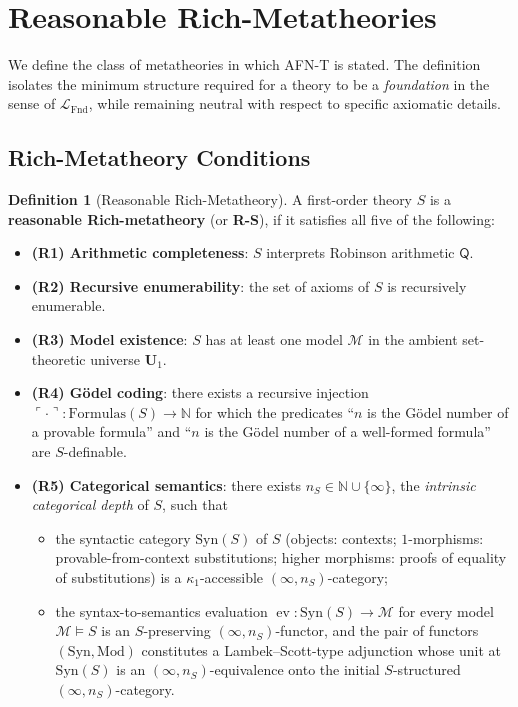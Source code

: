 \documentclass[11pt]{article}
\theoremstyle{plain}
\theoremstyle{definition}
\newtheorem{definition}[theorem]{Definition}
\newcommand{\cM}{\mathcal{M}}
\newcommand{\LFnd}{\mathcal{L}_{\mathrm{Fnd}}}
\newcommand{\Syn}{\mathrm{Syn}}
\newcommand{\Mod}{\mathrm{Mod}}
\DeclareMathOperator{\ev}{ev}
\begin{document}
\section{Reasonable Rich-Metatheories}\label{sec:rs}

We define the class of metatheories in which AFN-T is stated. The definition isolates the minimum structure required for a theory to be a \emph{foundation} in the sense of $\LFnd$, while remaining neutral with respect to specific axiomatic details.

\subsection{Rich-Metatheory Conditions}

\begin{definition}[Reasonable Rich-Metatheory]\label{def:rs}
A first-order theory $S$ is a \textbf{reasonable Rich-metatheory} (or \textbf{R-S}), if it satisfies all five of the following:
\begin{itemize}
\item \textbf{(R1) Arithmetic completeness}: $S$ interprets Robinson arithmetic $\mathsf{Q}$.
\item \textbf{(R2) Recursive enumerability}: the set of axioms of $S$ is recursively enumerable.
\item \textbf{(R3) Model existence}: $S$ has at least one model $\cM$ in the ambient set-theoretic universe $\mathbf{U}_1$.
\item \textbf{(R4) G\"odel coding}: there exists a recursive injection $\ulcorner \cdot \urcorner : \mathrm{Formulas}(S) \to \mathbb{N}$ for which the predicates ``$n$ is the G\"odel number of a provable formula'' and ``$n$ is the G\"odel number of a well-formed formula'' are $S$-definable.
\item \textbf{(R5) Categorical semantics}: there exists $n_S \in \mathbb{N} \cup \{\infty\}$, the \emph{intrinsic categorical depth} of $S$, such that
\begin{itemize}
\item[\textbf{(R5a)}] the syntactic category $\Syn(S)$ of $S$ (objects: contexts; $1$-morphisms: provable-from-context substitutions; higher morphisms: proofs of equality of substitutions) is a $\kappa_1$-accessible $(\infty, n_S)$-category;
\item[\textbf{(R5b)}] the syntax-to-semantics evaluation $\ev : \Syn(S) \to \cM$ for every model $\cM \models S$ is an $S$-preserving $(\infty, n_S)$-functor, and the pair of functors $(\Syn, \Mod)$ constitutes a Lambek--Scott-type adjunction whose unit at $\Syn(S)$ is an $(\infty, n_S)$-equivalence onto the initial $S$-structured $(\infty, n_S)$-category.

\end{itemize}
\end{itemize}
\end{definition}
\end{document}
